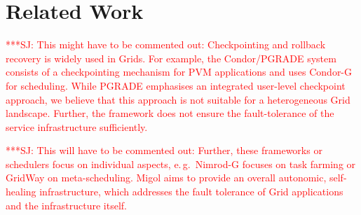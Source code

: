 \documentclass{rspublic}
\newcommand{\up}{}%
\newcommand{\jhanote}[1]{ {\textcolor{red} { ***SJ: #1 }}}
\newcommand{\jhanote}[1]{}
\begin{document}
\up
\section{Related Work}

\up
\jhanote{This might have to be commented out: Checkpointing and
  rollback recovery is widely used in Grids. For example, the
  Condor/PGRADE system~\cite{DBLP:conf/eagc/KovacsK04} consists of a
  checkpointing mechanism for PVM applications and uses
  Condor-G~\cite{citeulike:291860} for scheduling.  While PGRADE
  emphasises an integrated user-level checkpoint approach, we believe
  that this approach is not suitable for a heterogeneous Grid
  landscape. Further, the framework does not ensure the
  fault-tolerance of the service infrastructure sufficiently.}
                                 





\jhanote{This will have to be commented out: Further, these frameworks
  or schedulers focus on individual aspects, e.\,g.\ Nimrod-G focuses
  on task farming or GridWay on meta-scheduling. Migol aims to provide
  an overall autonomic, self-healing infrastructure, which addresses
  the fault tolerance of Grid applications and the infrastructure
  itself.}
\end{document}
